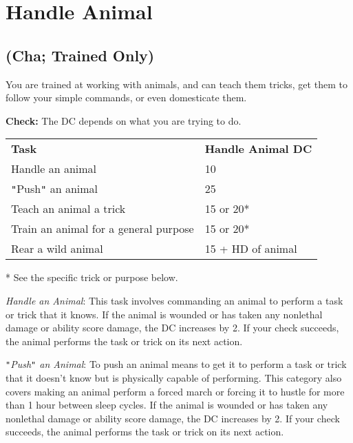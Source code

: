 \section{Handle Animal}

\label{f0}				
\subsection{(Cha; Trained Only)}

				
You are trained at working with animals, and can teach them tricks, get them to follow your simple commands, or even domesticate them.
				
\textbf{Check:} The DC depends on what you are trying to do.

\begin{table}
\sffamily
 \begin{tabular}{ll}
\textbf{Task} & \textbf{Handle Animal DC}\\
Handle an animal & 10\\
\texttt{{}"{}}Push\texttt{{}"{}} an animal & 25\\
Teach an animal a trick & 15 or 20*\\
Train an animal for a general purpose & 15 or 20*\\
Rear a wild animal & 15 + HD of animal \\
\end{tabular}
* See the specific trick or purpose below.
\end{table}
				
\textit{Handle an Animal}: This task involves commanding an animal to perform a task or trick that it knows. If the animal is wounded or has taken any nonlethal damage or ability score damage, the DC increases by 2. If your check succeeds, the animal performs the task or trick on its next action.
				
\texttt{{}"{}}\textit{Push\texttt{{}"{}} an Animal}: To push an animal means to get it to perform a task or trick that it doesn't know but is physically capable of performing. This category also covers making an animal perform a forced march or forcing it to hustle for more than 1 hour between sleep cycles. If the animal is wounded or has taken any nonlethal damage or ability score damage, the DC increases by 2. If your check succeeds, the animal performs the task or trick on its next action.
				
